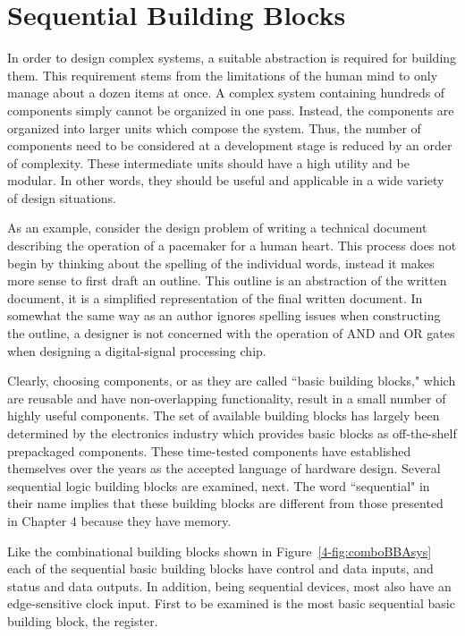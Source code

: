 \chapter{Sequential Building Blocks}
\label{chapter:Sequential Building Blocks}
\graphicspath{ {./chapter06/Fig} }

In order to design complex systems, a suitable
abstraction is required for building them.  This requirement stems from the
limitations of the human mind to only manage about a dozen items
at once.  A complex system containing hundreds of components
simply cannot be organized in one pass.  Instead, the components
are organized into larger units which compose the system. Thus,
the number of components need to be considered at a development stage is reduced
by an order of complexity. These intermediate units should have
a high utility and be modular.  In other words, they should be
useful and applicable in a wide variety of design situations.

As an example, consider the design problem of writing a technical
document describing the operation of a pacemaker for a human heart.
This process does not begin by thinking about the spelling of
the individual words, instead it makes more sense to first
draft an outline.  This outline is an abstraction of the
written document, it is a simplified representation of the final
written document.  In somewhat the same way as an author ignores
spelling issues when constructing the outline, a designer is not concerned with
the operation of AND and OR gates
when designing a digital-signal processing chip.

Clearly, choosing components, or as they are called ``basic
building blocks," which are reusable and have non-overlapping
functionality, result in a small number of highly useful
components.  The set of available building blocks has largely
been determined by the electronics industry which provides basic
blocks as off-the-shelf prepackaged components.  These
time-tested components have established themselves over the years
as the accepted language of hardware design.
Several sequential logic building blocks are examined, next.
The word ``sequential" in their name implies that these building
blocks are different from those presented in Chapter 4 because
they have memory.

Like the combinational building blocks shown in
Figure~\ref{4-fig:comboBBAsys} each of the sequential basic building
blocks have control and data inputs, and status and
data outputs.  In addition, being sequential devices, most
also have an edge-sensitive clock input.  First to be examined is
the most basic sequential basic building block, the register.
